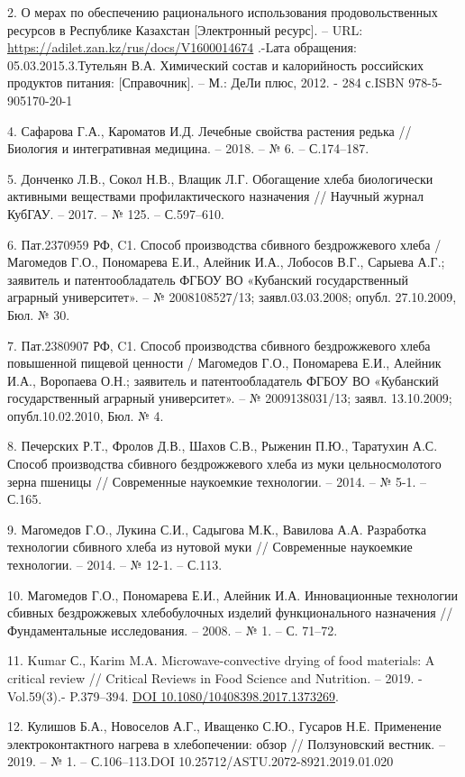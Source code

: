 2. О мерах по обеспечению рационального использования продовольственных
ресурсов в Республике Казахстан {[}Электронный ресурс{]}. -- URL:
\url{https://adilet.zan.kz/rus/docs/V1600014674} .-Lата обращения:
05.03.2015.3.Тутельян В.А. Химический состав и калорийность российских продуктов
питания: {[}Справочник{]}. -- М.: ДеЛи плюс, 2012. - 284 с.ISBN
978-5-905170-20-1

4. Сафарова Г.А., Кароматов И.Д. Лечебные свойства растения редька //
Биология и интегративная медицина. -- 2018. -- № 6. -- С.174--187.

5. Донченко Л.В., Сокол Н.В., Влащик Л.Г. Обогащение хлеба биологически
активными веществами профилактического назначения // Научный журнал
КубГАУ. -- 2017. -- № 125. -- С.597--610.

6. Пат.2370959 РФ, C1. Способ производства сбивного бездрожжевого хлеба
/ Магомедов Г.О., Пономарева Е.И., Алейник И.А., Лобосов В.Г., Сарыева
А.Г.; заявитель и патентообладатель ФГБОУ ВО «Кубанский государственный
аграрный университет». -- № 2008108527/13; заявл.03.03.2008; опубл.
27.10.2009, Бюл. № 30.

7. Пат.2380907 РФ, C1. Способ производства сбивного бездрожжевого хлеба
повышенной пищевой ценности / Магомедов Г.О., Пономарева Е.И., Алейник
И.А., Воропаева О.Н.; заявитель и патентообладатель ФГБОУ ВО «Кубанский
государственный аграрный университет». -- № 2009138031/13; заявл.
13.10.2009; опубл.10.02.2010, Бюл. № 4.

8. Печерских Р.Т., Фролов Д.В., Шахов С.В., Рыженин П.Ю., Таратухин А.С.
Способ производства сбивного бездрожжевого хлеба из муки цельносмолотого
зерна пшеницы // Современные наукоемкие технологии. -- 2014. -- № 5-1.
-- С.165.

9. Магомедов Г.О., Лукина С.И., Садыгова М.К., Вавилова А.А. Разработка
технологии сбивного хлеба из нутовой муки // Современные наукоемкие
технологии. -- 2014. -- № 12-1. -- С.113.

10. Магомедов Г.О., Пономарева Е.И., Алейник И.А. Инновационные
технологии сбивных бездрожжевых хлебобулочных изделий функционального
назначения // Фундаментальные исследования. -- 2008. -- № 1. -- С.
71--72.

11. Kumar С., Karim M.A. Microwave-convective drying of food materials: A
critical review // Critical Reviews in Food Science and Nutrition. --
2019. - Vol.59(3).- P.379--394.
\href{https://doi.org/10.1080/10408398.2017.1373269}{DOI
10.1080/10408398.2017.1373269}.

12. Кулишов Б.А., Новоселов А.Г., Иващенко С.Ю., Гусаров Н.Е. Применение
электроконтактного нагрева в хлебопечении: обзор // Ползуновский
вестник. -- 2019. -- № 1. -- С.106--113.DOI
10.25712/ASTU.2072-8921.2019.01.020

